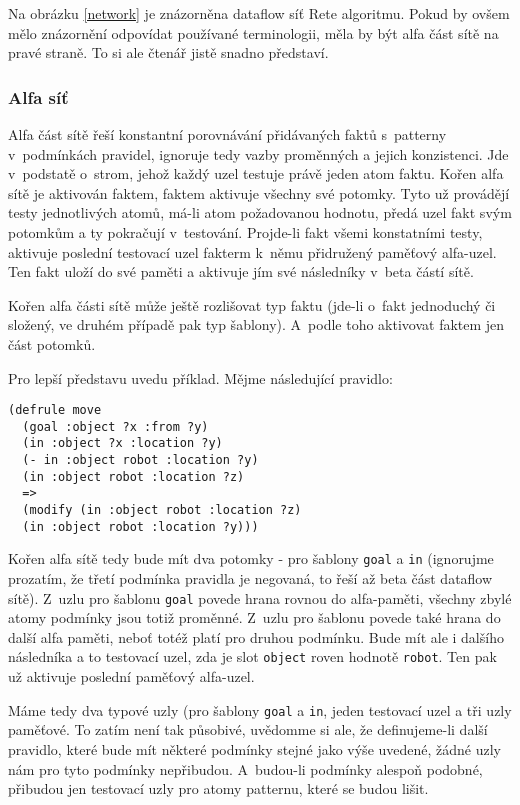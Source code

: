 Na obrázku \ref{network} je znázorněna dataflow síť Rete algoritmu.
Pokud by ovšem mělo znázornění odpovídat používané terminologii, měla
by být alfa část sítě na pravé straně. To si ale čtenář jistě snadno
představí.

\subsubsection{Alfa síť}
Alfa část sítě řeší konstantní porovnávání přidávaných faktů s~patterny
v~podmínkách pravidel, ignoruje tedy vazby proměnných a jejich konzistenci.
Jde v~podstatě o~strom, jehož každý uzel testuje právě jeden atom faktu.
Kořen alfa sítě je aktivován faktem, faktem aktivuje všechny své potomky.
Tyto už provádějí testy jednotlivých atomů, má-li atom požadovanou hodnotu,
předá uzel fakt svým potomkům a ty pokračují v~testování. Projde-li fakt
všemi konstatními testy, aktivuje poslední testovací uzel fakterm k~němu
přidružený paměťový alfa-uzel. Ten fakt uloží do své paměti a aktivuje
jím své následníky v~beta částí sítě.

Kořen alfa části sítě může ještě rozlišovat typ faktu (jde-li o~fakt
jednoduchý či složený, ve druhém případě pak typ šablony). A~podle toho
aktivovat faktem jen část potomků.

Pro lepší představu uvedu příklad. Mějme následující pravidlo:
\begin{verbatim}
(defrule move
  (goal :object ?x :from ?y)
  (in :object ?x :location ?y)
  (- in :object robot :location ?y)
  (in :object robot :location ?z)
  =>
  (modify (in :object robot :location ?z)
  (in :object robot :location ?y)))
\end{verbatim}
Kořen alfa sítě tedy bude mít dva potomky - pro šablony \verb|goal|
a \verb|in| (ignorujme prozatím, že třetí podmínka pravidla je negovaná,
to řeší až beta část dataflow sítě). Z~uzlu pro šablonu \verb|goal|
povede hrana rovnou do alfa-paměti, všechny zbylé atomy podmínky jsou
totiž proměnné. Z~uzlu pro šablonu povede také hrana do další alfa
paměti, neboť totéž platí pro druhou podmínku. Bude mít ale i dalšího
následníka a to testovací uzel, zda je slot \verb|object| roven hodnotě
\verb|robot|. Ten pak už aktivuje poslední paměťový alfa-uzel.

Máme tedy dva typové uzly (pro šablony \verb|goal| a \verb|in|, jeden
testovací uzel a tři uzly paměťové. To zatím není tak působivé,
uvědomme si ale, že definujeme-li další pravidlo, které bude mít
některé podmínky stejné jako výše uvedené, žádné uzly nám pro tyto
podmínky nepřibudou. A~budou-li podmínky alespoň podobné, přibudou
jen testovací uzly pro atomy patternu, které se budou lišit.

